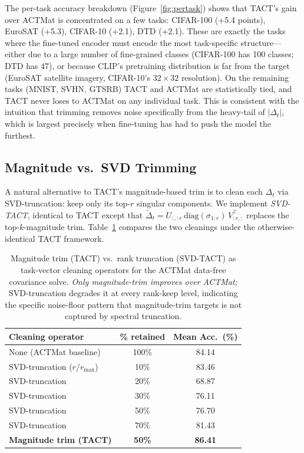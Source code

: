 \documentclass{article}
\theoremstyle{plain}
\theoremstyle{definition}
\theoremstyle{remark}
\begin{document}
The per-task accuracy breakdown (Figure~\ref{fig:pertask}) shows that TACT's gain over ACTMat is concentrated on a few tasks: CIFAR-100 (+5.4 points), EuroSAT (+5.3), CIFAR-10 (+2.1), DTD (+2.1). These are exactly the tasks where the fine-tuned encoder must encode the most task-specific structure---either due to a large number of fine-grained classes (CIFAR-100 has 100 classes; DTD has 47), or because CLIP's pretraining distribution is far from the target (EuroSAT satellite imagery, CIFAR-10's $32\times32$ resolution). On the remaining tasks (MNIST, SVHN, GTSRB) TACT and ACTMat are statistically tied, and TACT never loses to ACTMat on any individual task. This is consistent with the intuition that trimming removes noise specifically from the heavy-tail of $|\Delta_t|$, which is largest precisely when fine-tuning has had to push the model the furthest.

\subsection{Magnitude vs.~SVD Trimming}
\label{sec:exp_svd}

A natural alternative to TACT's magnitude-based trim is to clean each $\Delta_t$ via SVD-truncation: keep only its top-$r$ singular components. We implement \emph{SVD-TACT}, identical to TACT except that $\tilde\Delta_t = U_{:,:r}\,\mathrm{diag}(\sigma_{1:r})\,V_{:r,:}^\top$ replaces the top-$k$-magnitude trim. Table~\ref{tab:svd_vs_mag} compares the two cleanings under the otherwise-identical TACT framework.

\begin{table}[h]
\caption{Magnitude trim (TACT) vs.\ rank truncation (SVD-TACT) as task-vector cleaning operators for the ACTMat data-free covariance solve. \emph{Only magnitude-trim improves over ACTMat;} SVD-truncation degrades it at every rank-keep level, indicating the specific noise-floor pattern that magnitude-trim targets is not captured by spectral truncation.}
\label{tab:svd_vs_mag}
\centering
\small
\begin{tabular}{lcc}
\toprule
Cleaning operator & \% retained & Mean Acc.~(\%) \\
\midrule
None (ACTMat baseline) & 100\% & 84.14 \\
\midrule
SVD-truncation ($r/r_{\max}$) & 10\% & 83.46 \\
SVD-truncation              & 20\% & 68.87 \\
SVD-truncation              & 30\% & 76.11 \\
SVD-truncation              & 50\% & 76.70 \\
SVD-truncation              & 70\% & 81.43 \\
\midrule
\textbf{Magnitude trim (TACT)} & \textbf{50\%} & \textbf{86.41} \\
\bottomrule
\end{tabular}
\end{table}
\end{document}
